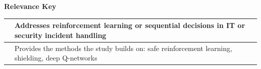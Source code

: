 \textbf{Relevance Key}

{\small
\begin{tabular}{|p{1cm}|p{12cm}|}
\hline
\cellcolor{green!15} & Addresses reinforcement learning or sequential decisions in IT or security incident handling \\ \hline
\cellcolor{yellow!25} & Provides the methods the study builds on: safe reinforcement learning, shielding, deep Q-networks \\ \hline
\end{tabular}
}
